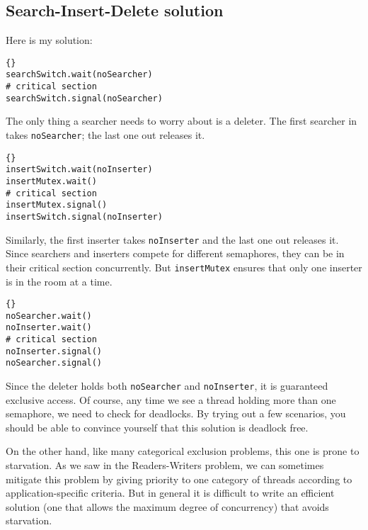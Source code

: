 \documentclass{book}
\newcommand{\clearemptydoublepage}{\newpage\cleardoublepage}
\begin{document}
\clearemptydoublepage
\subsection{Search-Insert-Delete solution}

Here is my solution:

\begin{lstlisting}[title={Search-Insert-Delete solution (searcher)}]{}
searchSwitch.wait(noSearcher)
# critical section
searchSwitch.signal(noSearcher)
\end{lstlisting}

The only thing a searcher needs to worry about is a deleter.
The first searcher in takes {\tt noSearcher}; the last one out
releases it.

\begin{lstlisting}[title={Search-Insert-Delete solution (inserter)}]{}
insertSwitch.wait(noInserter)
insertMutex.wait()
# critical section
insertMutex.signal()
insertSwitch.signal(noInserter)
\end{lstlisting}

Similarly, the first inserter takes {\tt noInserter} and the last one
out releases it.  Since searchers and inserters compete for different
semaphores, they can be in their critical section concurrently.
But {\tt insertMutex} ensures that only one inserter is in the room
at a time.

\begin{lstlisting}[title={Search-Insert-Delete solution (deleter)}]{}
noSearcher.wait()
noInserter.wait()
# critical section
noInserter.signal()
noSearcher.signal()

\end{lstlisting}

Since the deleter holds both {\tt noSearcher} and {\tt noInserter},
it is guaranteed exclusive access.  Of course, any time we see
a thread holding more than one semaphore, we need to check for
deadlocks.  By trying out a few scenarios, you should be able
to convince yourself that this solution is deadlock free.

On the other hand, like many categorical exclusion problems, this
one is prone to starvation.  As we saw in the Readers-Writers problem,
we can sometimes mitigate this problem by giving priority to one
category of threads according to application-specific criteria.
But in general it is difficult to write an efficient solution
(one that allows the maximum degree of concurrency)
that avoids starvation.
\end{document}
